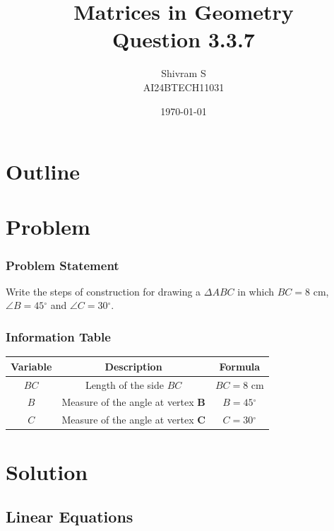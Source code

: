 \documentclass{beamer}
\title{Matrices in Geometry \\ Question 3.3.7}
\author{Shivram S \\ AI24BTECH11031}
\date{\today}
\theoremstyle{remark}
\let\vec\mathbf
\providecommand{\degree}{{^\circ}}
\numberwithin{equation}{section}
\begin{document}
\begin{frame}
\titlepage
\end{frame}

\section*{Outline}
\begin{frame}
\tableofcontents
\end{frame}

\section{Problem}

\begin{frame}
\frametitle{Problem Statement}
Write the steps of construction for drawing a $\Delta ABC$ in which $BC = 8$ cm, $\angle B = 45 \degree$ and $\angle C = 30 \degree$.
\end{frame}

\begin{frame}
\frametitle{Information Table}

\begin{table}[h!]
\centering    
\begin{tabular}{| c | c | c |}
   \hline
   \textbf{Variable} & \textbf{Description} & \textbf{Formula} \\ 
   \hline
   $BC$ & Length of the side $BC$ & $BC = 8$ cm \\
   \hline
   $B$ & Measure of the angle at vertex $\vec{B}$ & $B = 45 \degree$ \\
   \hline 
   $C$ & Measure of the angle at vertex $\vec{C}$ & $C = 30 \degree$ \\
   \hline
\end{tabular}
\end{table}

\end{frame}

\section{Solution}
\subsection{Linear Equations}
\end{document}
